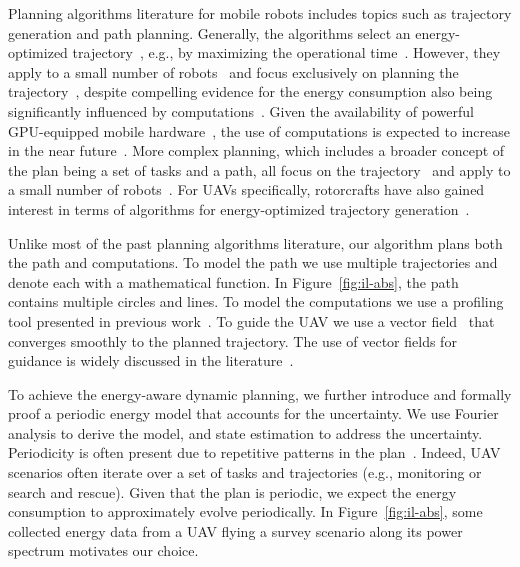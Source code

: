 \documentclass[letterpaper,10pt,conference]{ieeeconf}
\theoremstyle{definition}
\begin{document}
Planning algorithms literature for mobile robots includes topics such as trajectory generation and path planning. Generally, the algorithms select an energy-optimized trajectory~\cite{mei2004energy}, e.g., by maximizing the operational time~\cite{wahab2015energy}. However, they apply to a small number of robots~\cite{kim2005energy} and focus exclusively on planning the trajectory~\cite{kim2008minimum}, despite compelling evidence for the energy consumption also being significantly influenced by computations~\cite{mei2005case}. Given the availability of powerful GPU-equipped mobile hardware~\cite{rizvi2017general}, the use of computations is expected to increase in the near future~\cite{abramov2012real,satria2016real,jaramillo2019visual}. More complex planning, which includes a broader concept of the plan being a set of tasks and a path, all focus on the trajectory~\cite{mei2005case,mei2006deployment} and apply to a small number of robots~\cite{sadrpour2013mission,sadrpour2013experimental}. For UAVs specifically, rotorcrafts have also gained interest in terms of algorithms for energy-optimized trajectory generation~\cite{morbidi2016minimum,kreciglowa2017energy}. 

Unlike most of the past planning algorithms literature, our algorithm plans both the path and computations. To model the path we use multiple trajectories and denote each with a mathematical function. In Figure~\ref{fig:il-abs}, the path contains multiple circles and lines. To model the computations we use a profiling tool presented in previous work~\cite{seewald2019coarse}. To guide the UAV we use a vector field~\cite{de2017guidance} that converges smoothly to the planned trajectory. The use of vector fields for guidance is widely discussed in the literature~\cite{lindemann2005smoothly,gonccalves2010vector,panagou2014motion,zhou2014vector,kapitanyuk2017guiding,de2017guidance}. 

To achieve the energy-aware dynamic planning, we further introduce and formally proof a periodic energy model that accounts for the uncertainty. We use Fourier analysis to derive the model, and state estimation to address the uncertainty. Periodicity is often present due to repetitive patterns in the plan~\cite{seewald2020mechanical}. Indeed, UAV scenarios often iterate over a set of tasks and trajectories (e.g., monitoring or search and rescue). Given that the plan is periodic, we expect the energy consumption to approximately evolve periodically. In Figure~\ref{fig:il-abs}, some collected energy data from a UAV flying a survey scenario along its power spectrum motivates our choice.
\end{document}
